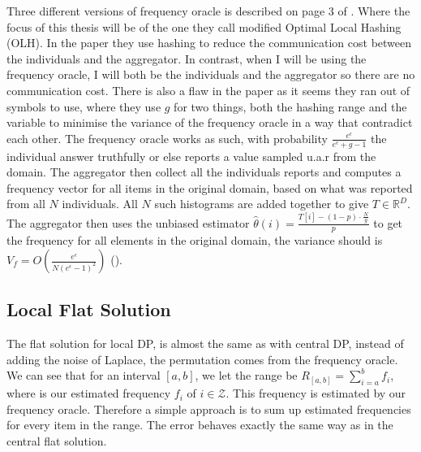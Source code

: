 \documentclass[11pt]{article}
\theoremstyle{definition}
\begin{document}
\noindent Three different versions of frequency oracle is described on page 3 of \cite{local} . Where the focus of this thesis will be of the one they call modified Optimal Local Hashing (OLH). In the paper they use hashing to reduce the communication cost between the individuals and the aggregator. In contrast, when I will be using the frequency oracle, I will both be the individuals and the aggregator so there are no communication cost. There is also a flaw in the paper as it seems they ran out of symbols to use, where they use $g$ for two things, both the hashing range and the variable to minimise the variance of the frequency oracle in a way that contradict each other. The frequency oracle works as such, with  probability $\frac{e^{\epsilon}}{e^{\epsilon}+g-1}$ the individual answer truthfully or else reports a value sampled u.a.r from the domain. The aggregator then collect all the individuals reports and  computes a frequency vector for all items in the original domain, based on what was reported from all $N$ individuals. All $N$ such histograms are added together to give $T\in\mathbb{R}^D$. The aggregator then uses the unbiased estimator $\hat{\theta}(i)= \frac{T[i] - (1-p) \cdot \frac{N}{g} }{p}$ to get the frequency for all elements in the original domain, the variance should is  $V_f= O\left(\frac{e^{\epsilon}}{N\left(e^{\epsilon}-1\right)^{2}}\right)$ (\cite[3]{local}). 

\subsection{Local Flat Solution}
The flat solution for local DP, is almost the same as with central DP, instead of adding the noise of Laplace, the permutation comes from the frequency oracle. 
We can see that for an interval $[a,b]$, we let the range be $R_{[a,b]}=\sum_{i=a}^b f_i$, where is our estimated frequency $f_i$ of $i\in \mathcal{Z}$. This frequency is estimated by our frequency oracle. Therefore a simple approach is to sum up estimated frequencies for every item in the range. The error behaves exactly the same way as in the central flat solution.
\end{document}
